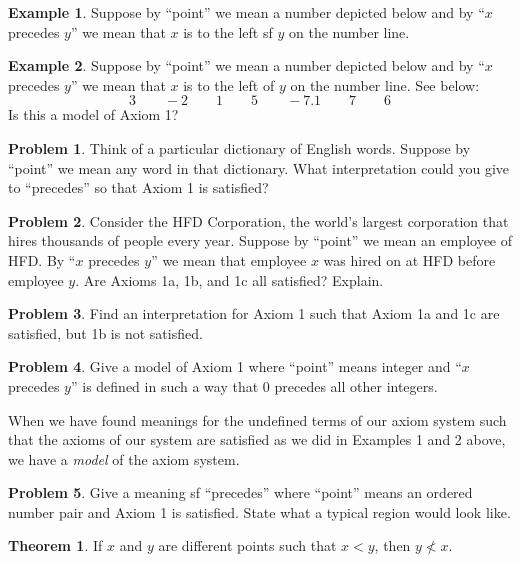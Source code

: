 \documentclass{article}
\theoremstyle{definition}
\newtheorem{theorem}{Theorem}
\theoremstyle{definition}
\newtheorem{example}{Example}
\newtheorem{problem}{Problem}
\theoremstyle{plain}
\begin{document}
\begin{example}
  Suppose by ``point'' we mean a number depicted below and by ``$x$ precedes
  $y$'' we mean that $x$ is to the left sf $y$ on the number line.
\end{example}

\begin{example}
  Suppose by ``point'' we mean a number depicted below and by ``$x$ precedes
  $y$'' we mean that $x$ is to the left of $y$ on the number line.  See below:
  \[3 \qquad -2 \qquad 1 \qquad 5 \qquad -7.1 \qquad 7 \qquad 6\]
  Is this a model of Axiom 1?
\end{example}

\begin{problem}
  Think of a particular dictionary of English words.  Suppose by ``point'' we
  mean any word in that dictionary.  What interpretation could you give to
  ``precedes'' so that Axiom 1 is satisfied?
\end{problem}

\begin{problem}
  Consider the HFD Corporation, the world's largest corporation that hires
  thousands of people every year.  Suppose by ``point'' we mean an employee of
  HFD.  By ``$x$ precedes $y$'' we mean that employee $x$ was hired on at HFD
  before employee $y$.  Are Axioms 1a, 1b, and 1c all satisfied? Explain.
\end{problem}

\begin{problem}
  Find an interpretation for Axiom 1 such that Axiom 1a and 1c are satisfied,
  but 1b is not satisfied.
\end{problem}

\begin{problem}
  Give a model of Axiom 1 where ``point'' means integer and ``$x$ precedes
  $y$'' is defined in such a way that 0 precedes all other integers.
\end{problem}

When we have found meanings for the undefined terms of our axiom system such
that the axioms of our system are satisfied as we did in Examples 1 and 2
above, we have a \emph{model} of the axiom system.

\begin{problem}
  Give a meaning sf ``precedes'' where ``point'' means an ordered number pair
  and Axiom 1 is satisfied.  State what a typical region would look like.
\end{problem}

\begin{theorem}
  If $x$ and $y$ are different points such that $x < y$, then $y \not< x$.
\end{theorem}
\end{document}
